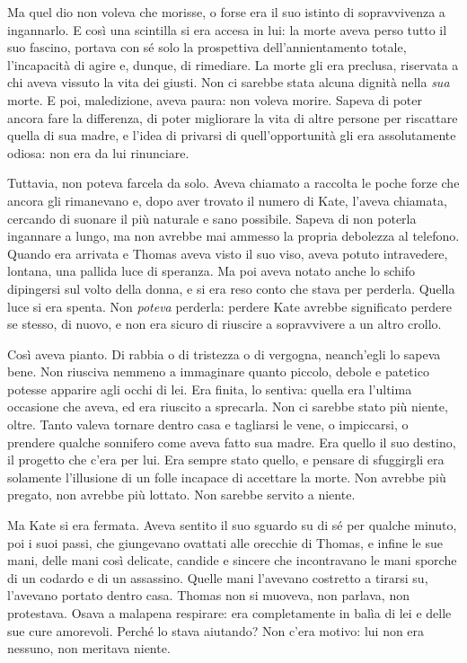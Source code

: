 \documentclass[a4paper,oneside,11pt]{memoir}
\begin{document}
Ma quel dio non voleva che morisse, o forse era il suo istinto di sopravvivenza
a ingannarlo. E così una scintilla si era accesa in lui: la morte aveva perso
tutto il suo fascino, portava con sé solo la prospettiva dell'annientamento
totale, l'incapacità di agire e, dunque, di rimediare. La morte gli era
preclusa, riservata a chi aveva vissuto la vita dei giusti. Non ci sarebbe stata
alcuna dignità nella \emph{sua} morte. E poi, maledizione, aveva paura: non
voleva morire. Sapeva di poter ancora fare la differenza, di poter migliorare la
vita di altre persone per riscattare quella di sua madre, e l'idea di privarsi
di quell'opportunità gli era assolutamente odiosa: non era da lui rinunciare.

Tuttavia, non poteva farcela da solo. Aveva chiamato a raccolta le poche forze
che ancora gli rimanevano e, dopo aver trovato il numero di Kate, l'aveva
chiamata, cercando di suonare il più naturale e sano possibile. Sapeva di non
poterla ingannare a lungo, ma non avrebbe mai ammesso la propria debolezza al
telefono. Quando era arrivata e Thomas aveva visto il suo viso, aveva potuto
intravedere, lontana, una pallida luce di speranza. Ma poi aveva notato anche lo
schifo dipingersi sul volto della donna, e si era reso conto che stava per
perderla. Quella luce si era spenta. Non \emph{poteva} perderla: perdere Kate
avrebbe significato perdere se stesso, di nuovo, e non era sicuro di riuscire a
sopravvivere a un altro crollo.

Così aveva pianto. Di rabbia o di tristezza o di vergogna, neanch'egli lo sapeva
bene. Non riusciva nemmeno a immaginare quanto piccolo, debole e patetico
potesse apparire agli occhi di lei. Era finita, lo sentiva: quella era l'ultima
occasione che aveva, ed era riuscito a sprecarla. Non ci sarebbe stato più
niente, oltre. Tanto valeva tornare dentro casa e tagliarsi le vene, o
impiccarsi, o prendere qualche sonnifero come aveva fatto sua madre. Era quello
il suo destino, il progetto che c'era per lui. Era sempre stato quello, e
pensare di sfuggirgli era solamente l'illusione di un folle incapace di
accettare la morte. Non avrebbe più pregato, non avrebbe più lottato. Non
sarebbe servito a niente.

Ma Kate si era fermata. Aveva sentito il suo sguardo su di sé per qualche
minuto, poi i suoi passi, che giungevano ovattati alle orecchie di Thomas, e
infine le sue mani, delle mani così delicate, candide e sincere che incontravano
le mani sporche di un codardo e di un assassino. Quelle mani l'avevano costretto
a tirarsi su, l'avevano portato dentro casa. Thomas non si muoveva, non parlava,
non protestava. Osava a malapena respirare: era completamente in balìa di lei e
delle sue cure amorevoli. Perché lo stava aiutando? Non c'era motivo: lui non
era nessuno, non meritava niente.
\end{document}
